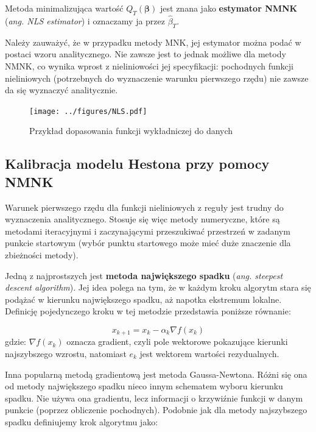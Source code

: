 \documentclass{pracamgr}
\begin{document}
Metoda minimalizująca wartość $Q_T(\mathbf{\beta})$ jest znana 
jako \textbf{estymator NMNK} (\textit{ang. NLS estimator}) i oznaczamy ja przez $\hat{\beta}_T$.

Należy zauważyć, że w przypadku metody MNK, jej estymator można podać w postaci wzoru
analitycznego. Nie zawsze jest to jednak możliwe dla metody NMNK, co wynika wprost z nieliniowości 
jej specyfikacji: pochodnych funkcji nieliniowych (potrzebnych do wyznaczenie warunku pierwszego rzędu) 
nie zawsze da się wyznaczyć analitycznie.


\begin{figure}
  \centering
  \texttt{[image: ../figures/NLS.pdf]}
  \caption{Przykład dopasowania funkcji wykładniczej do danych}
  \label{fig:volatilitySurface}
\end{figure}




\subsection{Kalibracja modelu Hestona przy pomocy NMNK}

Warunek pierwszego rzędu dla funkcji nieliniowych z reguły
jest trudny do wyznaczenia analitycznego. Stosuje się więc metody numeryczne, które są metodami 
iteracyjnymi i zaczynającymi przeszukiwać przestrzeń w zadanym punkcie startowym (wybór punktu 
startowego może mieć duże znaczenie dla zbieżności metody).

Jedną z najprostszych jest \textbf{metoda największego spadku} 
(\textit{ang. steepest descent algorithm}). Jej idea polega na tym, że w 
każdym kroku algorytm stara się podążać w kierunku największego spadku, aż 
napotka ekstremum lokalne. Definicję pojedynczego kroku w tej metodzie 
przedstawia poniższe równanie:


\begin{equation}
  x_{k+1} = x_k - \alpha_k \nabla f(x_k)
\end{equation}
gdzie: $\nabla f(x_k)$ oznacza gradient, czyli pole wektorowe pokazujące kierunki najszybszego 
wzrostu, natomiast $e_k$ jest wektorem wartości rezydualnych.


Inna popularną metodą gradientową jest metoda Gaussa-Newtona. Różni się ona od metody największego 
spadku nieco innym schematem wyboru kierunku spadku. Nie używa ona gradientu, 
lecz informacji o krzywiźnie funkcji w danym punkcie (poprzez obliczenie pochodnych).
Podobnie jak dla metody najszybszego spadku definiujemy krok algorytmu jako:
\end{document}

